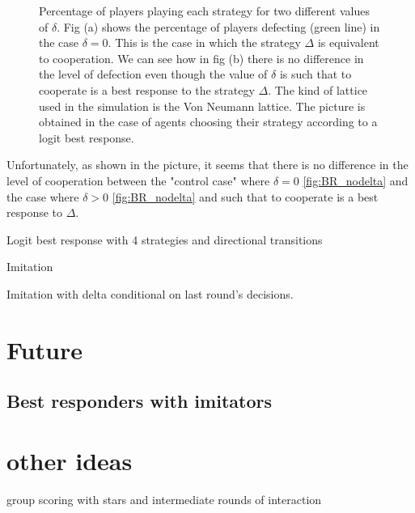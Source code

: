 \documentclass{article}
\begin{document}
\begin{figure}[htbp]
\begin{subfigure}[t]{0.47\textwidth}
  \label{fig:BR_delta} 
\end{subfigure}
\caption{Percentage of players playing each strategy for two different values of $\delta$.
Fig (a) shows the percentage of players defecting (green line) in the case $\delta =0$. This is the case in which the strategy $\Delta$ is equivalent to cooperation.
We can see how in fig (b) there is no difference in the level of defection even though the value of $\delta$ is such that to cooperate is a best response to the strategy $\Delta$.
The kind of lattice used in the simulation is the Von Neumann lattice.
The picture is obtained in the case of agents choosing their strategy according to a logit best response.
}
\label{fig:BR}
\end{figure} 

Unfortunately, as shown in the picture, it seems that there is no difference in the level of cooperation between the "control case" where $\delta=0$ \ref{fig:BR_nodelta} and the case where $\delta>0$  \ref{fig:BR_nodelta} and such that to cooperate is a best response to $\Delta$.


Logit best response with 4 strategies and directional transitions 

Imitation

Imitation with delta conditional on last round's decisions.

\section{Future}

\subsection{Best responders with imitators}

\section{other ideas}
group scoring with stars and intermediate rounds of interaction

\end{document}
